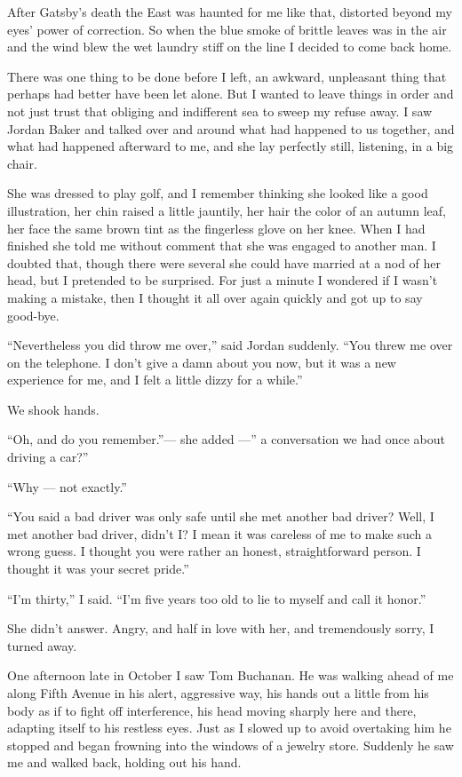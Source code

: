 \documentclass{znotebook}
\begin{document}
After Gatsby's death the East was haunted for me like that, distorted beyond my eyes' power of correction. So when the blue smoke of brittle leaves was in the air and the wind blew the wet laundry stiff on the line I decided to come back home.

There was one thing to be done before I left, an awkward, unpleasant thing that perhaps had better have been let alone. But I wanted to leave things in order and not just trust that obliging and indifferent sea to sweep my refuse away. I saw Jordan Baker and talked over and around what had happened to us together, and what had happened afterward to me, and she lay perfectly still, listening, in a big chair.

She was dressed to play golf, and I remember thinking she looked like a good illustration, her chin raised a little jauntily, her hair the color of an autumn leaf, her face the same brown tint as the fingerless glove on her knee. When I had finished she told me without comment that she was engaged to another man. I doubted that, though there were several she could have married at a nod of her head, but I pretended to be surprised. For just a minute I wondered if I wasn't making a mistake, then I thought it all over again quickly and got up to say good-bye.

``Nevertheless you did throw me over,'' said Jordan suddenly. ``You threw me over on the telephone. I don't give a damn about you now, but it was a new experience for me, and I felt a little dizzy for a while.''

We shook hands.

``Oh, and do you remember.''---{} she added ---'' a conversation we had once about driving a car?''

``Why ---{} not exactly.''

``You said a bad driver was only safe until she met another bad driver? Well, I met another bad driver, didn't I? I mean it was careless of me to make such a wrong guess. I thought you were rather an honest, straightforward person. I thought it was your secret pride.''

``I'm thirty,'' I said. ``I'm five years too old to lie to myself and call it honor.''

She didn't answer. Angry, and half in love with her, and tremendously sorry, I turned away.

One afternoon late in October I saw Tom Buchanan. He was walking ahead of me along Fifth Avenue in his alert, aggressive way, his hands out a little from his body as if to fight off interference, his head moving sharply here and there, adapting itself to his restless eyes. Just as I slowed up to avoid overtaking him he stopped and began frowning into the windows of a jewelry store. Suddenly he saw me and walked back, holding out his hand.
\end{document}
